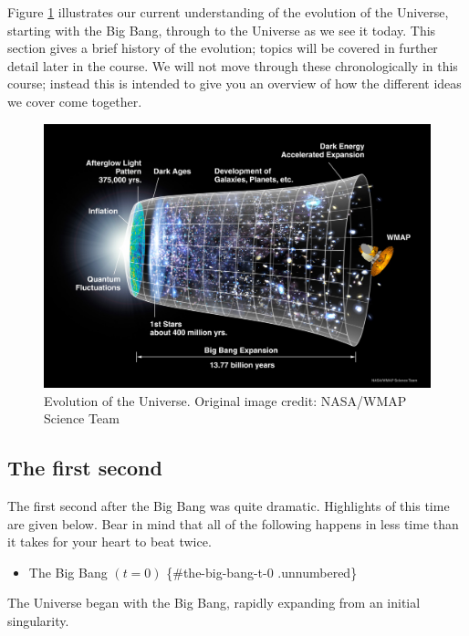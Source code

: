 \documentclass[11pt,a4paper,notoc]{tufte-handout}
\providecommand{\tightlist}{%
  \setlength{\itemsep}{0pt}\setlength{\parskip}{0pt}}
\begin{document}
Figure \ref{fig:evo-universe} illustrates our current understanding of
the evolution of the Universe, starting with the Big Bang, through to
the Universe as we see it today. This section gives a brief history of
the evolution; topics will be covered in further detail later in the
course. We will not move through these chronologically in this course;
instead this is intended to give you an overview of how the different
ideas we cover come together.

\begin{figure}
\includegraphics[width=1\linewidth]{Images/060915_CMB_Timeline150_annotated} \caption{Evolution of the Universe. Original image credit: NASA/WMAP Science Team}\label{fig:evo-universe}
\end{figure}

\hypertarget{sec:first_second}{%
\subsection{The first second}\label{sec:first_second}}

The first second after the Big Bang was quite dramatic. Highlights of
this time are given below. Bear in mind that all of the following
happens in less time than it takes for your heart to beat twice.

\begin{itemize}
\tightlist
\item
  The Big Bang \((t = 0)\) \{\#the-big-bang-t-0 .unnumbered\}
\end{itemize}

The Universe began with the Big Bang, rapidly expanding from an initial
singularity.
\end{document}

